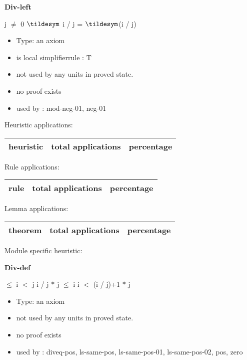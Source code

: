 \documentclass[a4paper]{article}
\begin{document}
{\LARGE\bf Div-left}\label{lemma-Div-left}

\medskip

 \Fol j $\neq$ 0 \Imp $\tildesym$ i / j = $\tildesym$(i / j)

\begin{itemize}

\item Type: an axiom

\item is local simplifierrule : T
\item not used by any units in proved state.
\item       no proof exists
\item       used by      : mod-neg-01, neg-01
\end{itemize}

\medskip


Heuristic applications:

\begin{supertabular}{l|r|r}
heuristic	& total applications & percentage \\ \hline

\end{supertabular}

Rule applications:

\begin{supertabular}{l|r|r}
rule	        & total applications & percentage \\ \hline

\end{supertabular}

Lemma applications:

\begin{supertabular}{l|r|r}
theorem	        & total applications & percentage \\ \hline

\end{supertabular}

Module specific heuristic:

\pagebreak

{\LARGE\bf Div-def}\label{lemma-Div-def}

\medskip

  $\le$ i  $<$ j \Imp i / j $*$ j $\le$ i \And i $<$ (i / j)+1 $*$ j

\begin{itemize}

\item Type: an axiom

\item not used by any units in proved state.
\item       no proof exists
\item       used by      : diveq-pos, ls-same-pos, ls-same-pos-01, ls-same-pos-02, pos, zero
\end{itemize}
\end{document}
